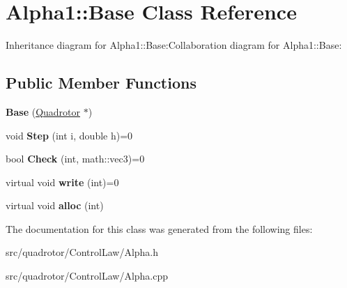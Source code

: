 \hypertarget{classAlpha1_1_1Base}{
\section{Alpha1::Base Class Reference}
\label{classAlpha1_1_1Base}
}
Inheritance diagram for Alpha1::Base:Collaboration diagram for Alpha1::Base:\subsection*{Public Member Functions}
\begin{DoxyCompactItemize}
\item 
\hypertarget{classAlpha1_1_1Base_aa3a30d6a7eb5a05d313a17c3aadfbc46}{
{\bfseries Base} (\hyperlink{classQuadrotor}{Quadrotor} $\ast$)}
\label{classAlpha1_1_1Base_aa3a30d6a7eb5a05d313a17c3aadfbc46}

\item 
\hypertarget{classAlpha1_1_1Base_a8b2ac7103a87426eca6243d7e00a62a4}{
void {\bfseries Step} (int i, double h)=0}
\label{classAlpha1_1_1Base_a8b2ac7103a87426eca6243d7e00a62a4}

\item 
\hypertarget{classAlpha1_1_1Base_a760efb3a3d35444c4eaa465f9d39fd0f}{
bool {\bfseries Check} (int, math::vec3)=0}
\label{classAlpha1_1_1Base_a760efb3a3d35444c4eaa465f9d39fd0f}

\item 
\hypertarget{classAlpha1_1_1Base_a73c402f3bcb3d5b1cd97f867bd47a847}{
virtual void {\bfseries write} (int)=0}
\label{classAlpha1_1_1Base_a73c402f3bcb3d5b1cd97f867bd47a847}

\item 
\hypertarget{classAlpha1_1_1Base_a7039181204826d9000f98f3acc59938f}{
virtual void {\bfseries alloc} (int)}
\label{classAlpha1_1_1Base_a7039181204826d9000f98f3acc59938f}

\end{DoxyCompactItemize}


The documentation for this class was generated from the following files:\begin{DoxyCompactItemize}
\item 
src/quadrotor/ControlLaw/Alpha.h\item 
src/quadrotor/ControlLaw/Alpha.cpp\end{DoxyCompactItemize}
